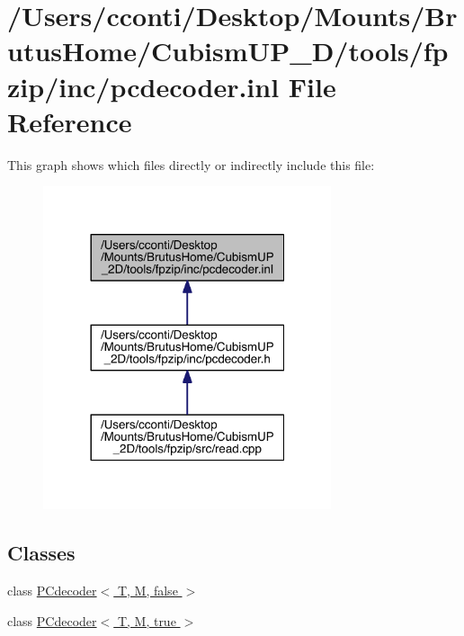 \hypertarget{pcdecoder_8inl}{}\section{/\+Users/cconti/\+Desktop/\+Mounts/\+Brutus\+Home/\+Cubism\+U\+P\+\_\+D/tools/fpzip/inc/pcdecoder.inl File Reference}
\label{pcdecoder_8inl}
This graph shows which files directly or indirectly include this file\+:\nopagebreak
\begin{figure}[H]
\begin{center}
\leavevmode
\includegraphics[width=240pt]{da/dba/pcdecoder_8inl__dep__incl}
\end{center}
\end{figure}
\subsection*{Classes}
\begin{DoxyCompactItemize}
\item 
class \hyperlink{class_p_cdecoder_3_01_t_00_01_m_00_01false_01_4}{P\+Cdecoder$<$ T, M, false $>$}
\item 
class \hyperlink{class_p_cdecoder_3_01_t_00_01_m_00_01true_01_4}{P\+Cdecoder$<$ T, M, true $>$}
\end{DoxyCompactItemize}
